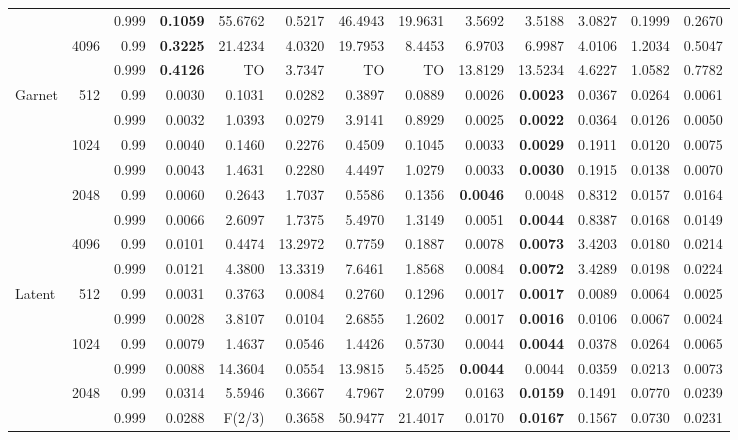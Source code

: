 \begin{landscape}
\begin{table}[p]
\begin{tabular}{@{}lrr*{10}{r}@{}}
 &  & 0.999 & \textbf{0.1059} & 55.6762 & 0.5217 & 46.4943 & 19.9631 & 3.5692 & 3.5188 & 3.0827 & 0.1999 & 0.2670 \\
 & 4096 & 0.99 & \textbf{0.3225} & 21.4234 & 4.0320 & 19.7953 & 8.4453 & 6.9703 & 6.9987 & 4.0106 & 1.2034 & 0.5047 \\
 &  & 0.999 & \textbf{0.4126} & TO & 3.7347 & TO & TO & 13.8129 & 13.5234 & 4.6227 & 1.0582 & 0.7782 \\
\midrule
Garnet & 512 & 0.99 & 0.0030 & 0.1031 & 0.0282 & 0.3897 & 0.0889 & 0.0026 & \textbf{0.0023} & 0.0367 & 0.0264 & 0.0061 \\
 &  & 0.999 & 0.0032 & 1.0393 & 0.0279 & 3.9141 & 0.8929 & 0.0025 & \textbf{0.0022} & 0.0364 & 0.0126 & 0.0050 \\
 & 1024 & 0.99 & 0.0040 & 0.1460 & 0.2276 & 0.4509 & 0.1045 & 0.0033 & \textbf{0.0029} & 0.1911 & 0.0120 & 0.0075 \\
 &  & 0.999 & 0.0043 & 1.4631 & 0.2280 & 4.4497 & 1.0279 & 0.0033 & \textbf{0.0030} & 0.1915 & 0.0138 & 0.0070 \\
 & 2048 & 0.99 & 0.0060 & 0.2643 & 1.7037 & 0.5586 & 0.1356 & \textbf{0.0046} & 0.0048 & 0.8312 & 0.0157 & 0.0164 \\
 &  & 0.999 & 0.0066 & 2.6097 & 1.7375 & 5.4970 & 1.3149 & 0.0051 & \textbf{0.0044} & 0.8387 & 0.0168 & 0.0149 \\
 & 4096 & 0.99 & 0.0101 & 0.4474 & 13.2972 & 0.7759 & 0.1887 & 0.0078 & \textbf{0.0073} & 3.4203 & 0.0180 & 0.0214 \\
 &  & 0.999 & 0.0121 & 4.3800 & 13.3319 & 7.6461 & 1.8568 & 0.0084 & \textbf{0.0072} & 3.4289 & 0.0198 & 0.0224 \\
\midrule
Latent & 512 & 0.99 & 0.0031 & 0.3763 & 0.0084 & 0.2760 & 0.1296 & 0.0017 & \textbf{0.0017} & 0.0089 & 0.0064 & 0.0025 \\
 &  & 0.999 & 0.0028 & 3.8107 & 0.0104 & 2.6855 & 1.2602 & 0.0017 & \textbf{0.0016} & 0.0106 & 0.0067 & 0.0024 \\
 & 1024 & 0.99 & 0.0079 & 1.4637 & 0.0546 & 1.4426 & 0.5730 & 0.0044 & \textbf{0.0044} & 0.0378 & 0.0264 & 0.0065 \\
 &  & 0.999 & 0.0088 & 14.3604 & 0.0554 & 13.9815 & 5.4525 & \textbf{0.0044} & 0.0044 & 0.0359 & 0.0213 & 0.0073 \\
 & 2048 & 0.99 & 0.0314 & 5.5946 & 0.3667 & 4.7967 & 2.0799 & 0.0163 & \textbf{0.0159} & 0.1491 & 0.0770 & 0.0239 \\
 &  & 0.999 & 0.0288 & F(2/3) & 0.3658 & 50.9477 & 21.4017 & 0.0170 & \textbf{0.0167} & 0.1567 & 0.0730 & 0.0231 \\

\end{tabular}
\end{table}
\end{landscape}

